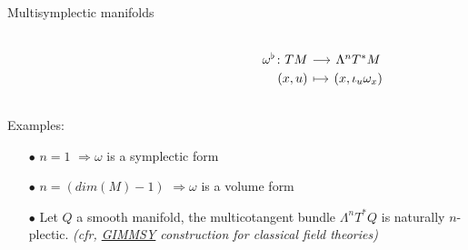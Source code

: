 \documentclass[10pt]{beamer}
\begin{document}
\begin{frame}[fragile]{Multisymplectic manifolds} %
	\begin{defblock}
			
	\end{defblock}
	\begin{defblock}
		\begin{columns}
			\begin{column}{.45\linewidth}
			\end{column}
			\begin{column}{.5\linewidth}
						\vspace{-.5em}
				\[
				\begin{tikzcd}[column sep= small,row sep=0ex,
				/tikz/column 1/.append style={anchor=base east}]
				    \omega^\flat \colon T M \ar[r]& \Lambda^n T^\ast M \\
  						 (x,u) \ar[r, mapsto]& (x,\iota_{u} \omega_x)						
				\end{tikzcd}	
				\]
			\end{column}
		\end{columns}
	\end{defblock}
	\vfill
	\begin{block}{Examples:}
		\vspace{-.5em}
		\begin{itemize}[<+->]
			\item[$\bullet$] $n=1$ \qquad\qquad\qquad $\Rightarrow$\quad $\omega$ is a symplectic form
			\item[$\bullet$]  $n=(dim(M)-1)$ \quad$\Rightarrow$\quad $\omega$ is a volume form
			\item[$\bullet$] Let $Q$ a smooth manifold, the multicotangent bundle $\Lambda^n T^\ast Q$ is naturally $n$-plectic.%
			\quad
			\textit{(cfr, \href{https://arxiv.org/abs/physics/9801019}{GIMMSY} construction for classical field theories)}
		\end{itemize}
	\end{block}			 
	
%
\end{frame}
\end{document}
